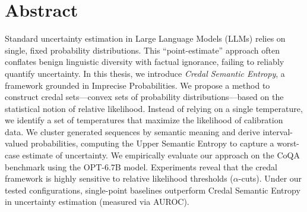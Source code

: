 %
\chapter*{Abstract}
\label{sec:abstract}
\vspace*{-10mm}

Standard uncertainty estimation in Large Language Models (LLMs) 
relies on single, fixed probability distributions. This 
``point-estimate'' approach often conflates benign linguistic 
diversity with factual ignorance, failing to reliably quantify 
uncertainty.
In this thesis, we introduce \textit{Credal Semantic Entropy},
a framework grounded in Imprecise Probabilities. 
We propose a method to construct credal sets---convex sets of 
probability distributions---based on the statistical notion of 
relative likelihood. Instead of relying on a single temperature,
we identify a set of temperatures that
maximize the likelihood of calibration data. We cluster generated
sequences by semantic meaning and derive interval-valued
probabilities, computing the Upper Semantic Entropy to capture
a worst-case estimate of uncertainty.
We empirically evaluate our approach on the CoQA benchmark using
the OPT-6.7B model. Experiments 
reveal that the credal framework is highly sensitive to relative
likelihood thresholds ($\alpha$-cuts). Under our tested 
configurations, single-point baselines outperform Credal Semantic 
Entropy in uncertainty estimation (measured via AUROC).

\vspace*{20mm}

